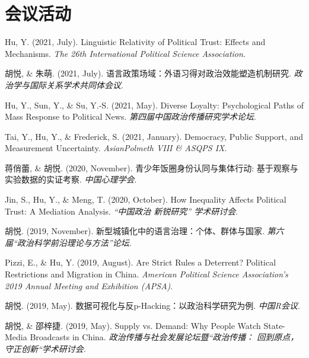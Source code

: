 \documentclass[11pt, a4paper]{awesome-cv}
\begin{document}
\hypertarget{ux4f1aux8baeux6d3bux52a8}{%
\section{会议活动}\label{ux4f1aux8baeux6d3bux52a8}}

\begingroup
\setlength{\parindent}{-0.5in}
\setlength{\leftskip}{0.5in}

\hypertarget{refs_conference}{}
\leavevmode\hypertarget{ref-Hu2021a}{}%
Hu, Y. (2021, July). Linguistic {Relativity} of {Political Trust}:
{Effects} and {Mechanisms}. \emph{The 26th {International Political
Science Association}}.

\leavevmode\hypertarget{ref-HuYueZhuMeng2021}{}%
胡悦, \& 朱萌. (2021, July).
语言政策场域：外语习得对政治效能塑造机制研究.
\emph{政治学与国际关系学术共同体会议}.

\leavevmode\hypertarget{ref-HuEtAl2021a}{}%
Hu, Y., Sun, Y., \& Su, Y.-S. (2021, May). Diverse {Loyalty}:
{Psychological Paths} of {Mass Response} to {Political News}.
\emph{第四届中国政治传播研究学术论坛}.

\leavevmode\hypertarget{ref-TaiEtAl2021}{}%
Tai, Y., Hu, Y., \& Frederick, S. (2021, January). Democracy, {Public
Support}, and {Measurement Uncertainty}. \emph{{AsianPolmeth VIII} \&
{ASQPS IX}}.

\leavevmode\hypertarget{ref-JiangQiaoLeiHuYue2020}{}%
蒋俏蕾, \& 胡悦. (2020, November). 青少年饭圈身份认同与集体行动:
基于观察与实验数据的实证考察. \emph{中国心理学会}.

\leavevmode\hypertarget{ref-JinEtAl2020}{}%
Jin, S., Hu, Y., \& Meng, T. (2020, October). How {Inequality Affects
Political Trust}: {A Mediation Analysis}. \emph{{``中国政治 新锐研究''}
学术研讨会}.

\leavevmode\hypertarget{ref-HuYue2019a}{}%
胡悦. (2019, November). 新型城镇化中的语言治理：个体、群体与国家.
\emph{第六届{``政治科学前沿理论与方法''}论坛}.

\leavevmode\hypertarget{ref-PizziHu2019}{}%
Pizzi, E., \& Hu, Y. (2019, August). Are {Strict Rules} a {Deterrent}?
{Political Restrictions} and {Migration} in {China}. \emph{American
{Political Science Association}'s 2019 {Annual Meeting} and {Exhibition}
({APSA})}.

\leavevmode\hypertarget{ref-HuYue2019b}{}%
胡悦. (2019, May). 数据可视化与反p-{Hacking}：以政治科学研究为例.
\emph{{中国R会议}}.

\leavevmode\hypertarget{ref-HuYueShaoZiJie2019}{}%
胡悦, \& 邵梓捷. (2019, May). Supply vs. {Demand}: {Why People Watch
State}-{Media Broadcasts} in {China}.
\emph{政治传播与社会发展论坛暨``政治传播：
回到原点，守正创新``学术研讨会}.
\end{document}
